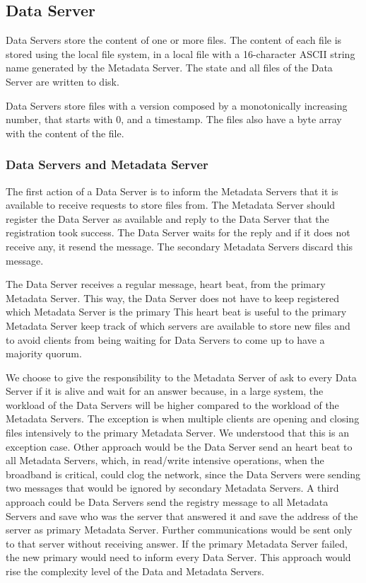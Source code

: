 \subsection{Data Server}

Data Servers store the content of one or more files. The content of each
file is stored using the local file system, in a local file with a
16-character ASCII string name generated by the Metadata Server. The
state and all files of the Data Server are written to disk.

Data Servers store files with a version composed by a
monotonically increasing number, that starts with 0, and a timestamp.
The files also have a byte array with the content of the file.

\subsubsection{Data Servers and Metadata Server}

The first action of a Data Server is to inform the Metadata Servers that
it is available to receive requests to store files from. The Metadata
Server should register the Data Server as available and reply to the Data
Server that the registration took success. The Data Server waits for the
reply and if it does not receive any, it resend the message. The secondary
Metadata Servers discard this message.

The Data Server receives a regular message, heart beat, from the primary
Metadata Server. This way, the Data Server does not have to keep
registered which Metadata Server is the primary
This heart beat is useful to the primary Metadata Server keep track of
which servers are available to store new files and to avoid clients
from being waiting for Data Servers to come up to have a majority quorum.

We choose to give the responsibility to the Metadata Server of ask to
every Data Server if it is alive and wait for an answer because, in a large
system, the workload of the Data Servers will be higher compared to the
workload of the Metadata Servers. The exception is when multiple clients
are opening and closing files intensively to the primary Metadata Server. We
understood that this is an exception case. Other approach would be the Data
Server send an heart beat to all Metadata Servers, which, in read/write
intensive operations, when the broadband is critical, could clog the network,
since the Data Servers were sending two messages that would be ignored by
secondary Metadata Servers.
A third approach could be Data Servers send the registry message to all
Metadata Servers and save who was the server that answered it and save the
address of the server as primary Metadata Server. Further communications
would be sent only to that server without receiving answer. If the primary
Metadata Server failed, the new primary would need to inform every Data
Server. This approach would rise the complexity level of the Data and
Metadata Servers.


